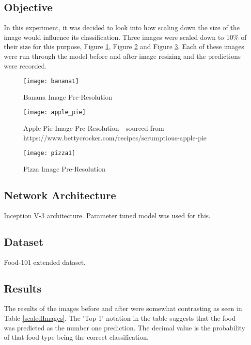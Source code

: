 \tocless\subsection{Objective}
In this experiment, it was decided to look into how scaling down the size of the image would influence its classification. Three images were scaled down to 10\% of their size for this purpose, Figure \ref{fig:bananaPreRes}, Figure \ref{fig:apple_piePreRes} and Figure \ref{fig:pizzaPreRes}. Each of these images were run through the model before and after image resizing and the predictions were recorded.

\begin{figure}[h]
	\centering
    \texttt{[image: banana1]}
    \caption{Banana Image Pre-Resolution}
    \label{fig:bananaPreRes}
\end{figure}

\begin{figure}[h]
	\centering
    \texttt{[image: apple\_pie]}
    \caption{Apple Pie Image Pre-Resolution - sourced from https://www.bettycrocker.com/recipes/scrumptious-apple-pie}
    \label{fig:apple_piePreRes}
\end{figure}

\begin{figure}[h]
	\centering
    \texttt{[image: pizza1]}
    \caption{Pizza Image Pre-Resolution}
    \label{fig:pizzaPreRes}
\end{figure}

\tocless\subsection{Network Architecture}
Inception V-3 architecture. Parameter tuned model was used for this.

\tocless\subsection{Dataset}
Food-101 extended dataset.

\tocless\subsection{Results}
The results of the images before and after were somewhat contrasting as seen in Table \ref{scaledImages}.
The 'Top 1' notation in the table suggests that the food was predicted as the number one prediction. The decimal value is the probability of that food type being the correct classification.

